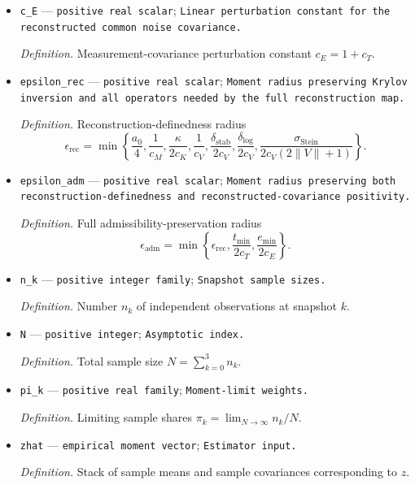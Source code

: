 \documentclass{article}
\begin{document}
\begin{itemize}
  \par\smallskip\noindent\emph{Definition.} Stein-reconstruction perturbation constant \(c_T=2\sigma_{\mathrm{Stein}}^{-1}[2\sqrt p+c_V(2\lVert V\rVert+1)\lVert T_V\rVert_F]\).
  \item \texttt{c\_\allowbreak{}E} --- \texttt{positive real scalar}; \texttt{Linear perturbation constant for the reconstructed common noise covariance.}
  \par\smallskip\noindent\emph{Definition.} Measurement-covariance perturbation constant \(c_E=1+c_T\).
  \item \texttt{epsilon\_\allowbreak{}rec} --- \texttt{positive real scalar}; \texttt{Moment radius preserving Krylov inversion and all operators needed by the full reconstruction map.}
  \par\smallskip\noindent\emph{Definition.} Reconstruction-definedness radius \[\epsilon_{\mathrm{rec}}=\min\left\{\frac{a_0}{4},\frac1{c_M},\frac{\kappa}{2c_K},\frac1{c_V},\frac{\delta_{\mathrm{stab}}}{2c_V},\frac{\delta_{\log}}{2c_V},\frac{\sigma_{\mathrm{Stein}}}{2c_V(2\lVert V\rVert+1)}\right\}.\]
  \item \texttt{epsilon\_\allowbreak{}adm} --- \texttt{positive real scalar}; \texttt{Moment radius preserving both reconstruction-\allowbreak{}definedness and reconstructed-\allowbreak{}covariance positivity.}
  \par\smallskip\noindent\emph{Definition.} Full admissibility-preservation radius \[\epsilon_{\mathrm{adm}}=\min\left\{\epsilon_{\mathrm{rec}},\frac{t_{\min}}{2c_T},\frac{e_{\min}}{2c_E}\right\}.\]
  \item \texttt{n\_\allowbreak{}k} --- \texttt{positive integer family}; \texttt{Snapshot sample sizes.}
  \par\smallskip\noindent\emph{Definition.} Number \(n_k\) of independent observations at snapshot \(k\).
  \item \texttt{N} --- \texttt{positive integer}; \texttt{Asymptotic index.}
  \par\smallskip\noindent\emph{Definition.} Total sample size \(N=\sum_{k=0}^3 n_k\).
  \item \texttt{pi\_\allowbreak{}k} --- \texttt{positive real family}; \texttt{Moment-\allowbreak{}limit weights.}
  \par\smallskip\noindent\emph{Definition.} Limiting sample shares \(\pi_k=\lim_{N\to\infty}n_k/N\).
  \item \texttt{zhat} --- \texttt{empirical moment vector}; \texttt{Estimator input.}
  \par\smallskip\noindent\emph{Definition.} Stack of sample means and sample covariances corresponding to \(z\).

\end{itemize}
\end{document}
